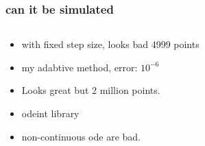 \documentclass{beamer}
\begin{document}
\begin{frame}
\frametitle{can it be simulated}
\begin{columns}
\begin{column}{0.5\linewidth}
\begin{itemize}
\item<1-> with fixed step size, looks bad 4999 points

\item<2- > my adabtive method, error: $10^{-6}$

\item<2- > Looks great but 2 million points.

\item<3-> odeint library

\item<4-> non-continuous ode are bad.

\end{itemize}
\end{column}
\begin{column}{0.5\linewidth}
\end{column}
\end{columns}
\end{frame}
\end{document}
